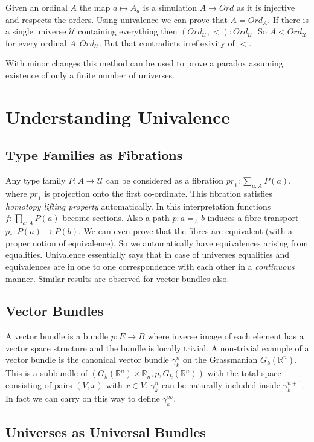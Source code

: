 \documentclass[10pt]{article}
\theoremstyle{definition}
\theoremstyle{plain}
\theoremstyle{remark}
\newcommand{\U}{\mathscr{U}}
\begin{document}
Given an ordinal $A$ the map $a \mapsto A_a$ is a simulation $A \to {Ord}$ as it is 
injective and respects the orders. Using univalence we can prove that $A = {Ord}_A$. 
If there is a single universe $\U$ containing everything then 
$({Ord}_{\U},<) : {Ord}_{\U}$. So $A < {Ord}_{\U}$ for every ordinal 
$A : {Ord}_{\U}$. But that contradicts irreflexivity of $<$.\smallskip

With minor changes this method can be used to prove a paradox assuming existence of only a
finite number of universes. 

\section{Understanding Univalence}\label{S:UU}

\subsection{Type Families as Fibrations}
Any type family $P : A \to \U$ can be considered as a fibration 
${ {pr}_1 : \sum_{a : A} P(a) }$, where ${pr}_1$ is projection onto the first
co-ordinate. This fibration satisfies \emph{homotopy lifting property} automatically. 
In this interpretation functions $f : \prod_{a : A} P(a)$ become sections. Also a path 
$p : a =_A b$ induces a fibre transport $p_* : P(a) \to P(b)$. We can even prove that the 
fibres are equivalent (with a proper notion of equivalence). So we automatically have 
equivalences arising from equalities. Univalence essentially says that in case of universes
equalities and equivalences are in one to one correspondence with each other in a 
\emph{continuous} manner. Similar results are observed for vector bundles also.

\subsection{Vector Bundles}
A vector bundle is a bundle $p : E \to B$ where inverse image of each element has a 
vector space structure and the bundle is locally trivial. A non-trivial example of a 
vector bundle is the canonical vector bundle $\gamma^n_k$ on the Grassmanian 
$G_k(\mathbb{R}^n)$. This is a 
subbundle of $(G_k(\mathbb{R}^n) \times \mathbb{R}_n,p,G_k(\mathbb{R}^n))$ with the total
space consisting of pairs $(V,x)$ with $x\in V$. $\gamma^n_k$ can be naturally included 
inside $\gamma^{n+1}_k$. In fact we can carry on this way to define $\gamma^{\infty}_k$. 

\subsection{Universes as Universal Bundles}
\end{document}
